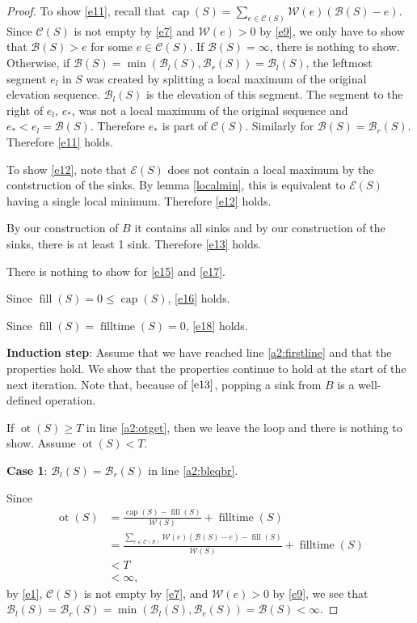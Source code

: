 \documentclass[11pt,a4paper]{article}
\DeclareMathOperator{\capp}{cap}
\DeclareMathOperator{\ot}{ot}
\DeclareMathOperator{\Fill}{fill}
\DeclareMathOperator{\filltime}{filltime}
\begin{document}
\begin{proof}
To show \ref{e11}, recall that $\capp(S) = \sum_{e\in\mathcal{C}(S)} \mathcal{W}(e)(\mathcal{B}(S)-e)$.
Since $\mathcal{C}(S)$ is not empty by \ref{e7} and $\mathcal{W}(e) > 0$ by \ref{e9}, we only have
to show that $\mathcal{B}(S) > e$ for some $e\in\mathcal{C}(S)$.
If $\mathcal{B}(S)=\infty$, there is nothing to show.
Otherwise, if $\mathcal{B}(S) = \min(\mathcal{B}_l(S), \mathcal{B}_r(S)) = \mathcal{B}_l(S)$, the leftmost segment $e_l$ in $S$ was created by splitting a local maximum of the original elevation sequence.
$\mathcal{B}_l(S)$ is the elevation of this segment.
The segment to the right of $e_l$, $e_*$, was not a local maximum of the original sequence and $e_* < e_l = \mathcal{B}(S)$.
Therefore $e_*$ is part of $\mathcal{C}(S)$.
Similarly for $\mathcal{B}(S) = \mathcal{B}_r(S)$.
Therefore \ref{e11} holds.

To show \ref{e12}, note that $\mathcal{E}(S)$ does not contain a local maximum by the contstruction of the sinks.
By lemma \ref{localmin}, this is equivalent to $\mathcal{E}(S)$ having a single local minimum.
Therefore \ref{e12} holds.

By our construction of $B$ it contains all sinks and by our construction of the sinks, there is at least 1 sink.
Therefore \ref{e13} holds.

There is nothing to show for \ref{e15} and \ref{e17}.

Since $\Fill(S) = 0 \le \capp(S)$, \ref{e16} holds.

Since $\Fill(S) = \filltime(S) = 0$, \ref{e18} holds.

\textbf{Induction step}: Assume that we have reached line \ref{a2:firstline} and that the properties hold.
We show that the properties continue to hold at the start of the next iteration.
Note that, because of $\ref{e13}$, popping a sink from $B$ is a well-defined operation.

If $\ot(S)\ge T$ in line \ref{a2:otget}, then we leave the loop and there is nothing to show.
Assume $\ot(S) < T$.

\textbf{Case 1}: $\mathcal{B}_l(S) = \mathcal{B}_r(S)$ in line \ref{a2:bleqbr}.

Since 
\begin{align*}
    \ot(S) &= \frac{\capp(S) - \Fill(S)}{\mathcal{W}(S)} + \filltime(S) \\
           &= \frac{\sum_{e\in\mathcal{C}(S)} \mathcal{W}(e)(\mathcal{B}(S)-e) - \Fill(S)}{\mathcal{W}(S)} + \filltime(S) \\
           &< T \\
           &< \infty,
\end{align*}
by \ref{e1}, $\mathcal{C}(S)$ is not empty by \ref{e7}, and $\mathcal{W}(e) > 0$ by \ref{e9},
we see that $\mathcal{B}_l(S) = \mathcal{B}_r(S) = \min(\mathcal{B}_l(S), \mathcal{B}_r(S)) = \mathcal{B}(S) < \infty$.


\end{proof}
\end{document}
